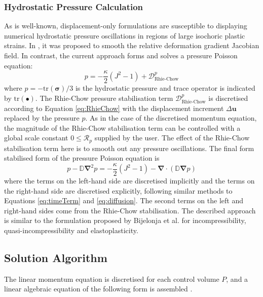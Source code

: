 \documentclass[sn-mathphys,Numbered,draft]{sn-jnl}%
\newcommand{\bb}{\boldsymbol}
\begin{document}
\subsubsection{Hydrostatic Pressure Calculation} \label{sec:pressureApproach}
As is well-known, displacement-only formulations are susceptible to displaying numerical hydrostatic pressure oscillations in regions of large isochoric plastic strains.
In \citet{cardiff_lagrangian_2017}, it was proposed to smooth the relative deformation gradient Jacobian field.
In contrast, the current approach forms and solves a pressure Poisson equation:
\begin{equation}
	p = -\frac{\kappa}{2} (J^{2} - 1) + \mathcal{D}_{\text{Rhie-Chow}}^p
\end{equation}
where $p = - \text{tr}(\bb{\sigma})/3$ is the hydrostatic pressure and trace operator is indicated by $\text{tr}(\bullet)$.
The Rhie-Chow pressure stabilisation term $\mathcal{D}_{\text{Rhie-Chow}}^p$ is discretised according to Equation \ref{eq:RhieChow} with the displacement increment $\Delta \bb{u}$ replaced by the pressure $p$.
As in the case of the discretised momentum equation, the magnitude of the Rhie-Chow stabilisation term can be controlled with a global scale constant $0 \leq \mathcal{R}_p$ supplied by the user.
The effect of the Rhie-Chow stabilisation term here is to smooth out any pressure oscillations.
The final form stabilised form of the pressure Poisson equation is 
\begin{equation} \label{eq:pressureEqn}
	p - \mathbb{D} \bb{\nabla}^2 p = -\frac{\kappa}{2} (J^{2} - 1) - \bb{\nabla} \cdot \left( \mathbb{D} \bb{\nabla} p \right)
\end{equation}
where the terms on the left-hand side are discretised implicitly and the terms on the right-hand side are discretised explicitly, following similar methods to Equations \ref{eq:timeTerm} and \ref{eq:diffusion}.
The second terms on the left and right-hand sides come from the Rhie-Chow stabilisation.
The described approach is similar to the formulation proposed by Bijelonja et al. \cite{Bijelonja2002, Bijelonja2005a, Bijelonja2005b, Bijelonja2006} for incompressibility, quasi-incompressibility and elastoplasticity.

\subsection{Solution Algorithm}

The linear momentum equation is discretised for each control volume $P$, and a linear algebraic equation of the following form is assembled \cite{jasak_application_2000}.
\end{document}
